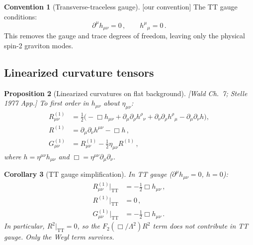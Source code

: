 \documentclass[12pt,a4paper]{article}
\newtheorem{proposition}{Proposition}[section]
\newtheorem{corollary}[proposition]{Corollary}
\theoremstyle{definition}
\newtheorem{convention}[proposition]{Convention}
\theoremstyle{remark}
\newcommand{\fromlit}[1]{\textcolor{blue!70!black}{\textsf{[#1]}}}
\newcommand{\oursign}{\textcolor{teal!80!black}{\textsf{[our convention]}}}
\begin{document}
\begin{convention}[Transverse-traceless gauge]
\label{conv:tt-gauge}
\oursign\;
The TT gauge conditions:
\begin{equation}
  \partial^\mu h_{\mu\nu} = 0\,,
  \qquad h^\mu{}_\mu = 0\,.
  \label{eq:tt-conditions}
\end{equation}
This removes the gauge and trace degrees of freedom, leaving
only the physical spin-2 graviton modes.
\end{convention}


\subsection{Linearized curvature tensors}

\begin{proposition}[Linearized curvatures on flat background]
\label{prop:linearized-curvatures}
\fromlit{Wald Ch.~7; Stelle 1977 App.}
To first order in $h_{\mu\nu}$ about $\eta_{\mu\nu}$:
\begin{align}
  R_{\mu\nu}^{(1)} &= \frac{1}{2}\bigl(
    -\Box h_{\mu\nu} + \partial_\mu\partial_\rho h^\rho{}_\nu
    + \partial_\nu\partial_\rho h^\rho{}_\mu
    - \partial_\mu\partial_\nu h
  \bigr),
  \label{eq:ricci-lin}\\[4pt]
  R^{(1)} &= \partial_\mu\partial_\nu h^{\mu\nu} - \Box h\,,
  \label{eq:scalar-lin}\\[4pt]
  G_{\mu\nu}^{(1)} &= R_{\mu\nu}^{(1)}
    - \frac{1}{2}\eta_{\mu\nu}R^{(1)}\,,
  \label{eq:einstein-lin}
\end{align}
where $h = \eta^{\mu\nu}h_{\mu\nu}$ and $\Box =
\eta^{\mu\nu}\partial_\mu\partial_\nu$.
\end{proposition}

\begin{corollary}[TT gauge simplification]
\label{cor:tt-simplification}
In TT gauge ($\partial^\mu h_{\mu\nu} = 0$, $h = 0$):
\begin{align}
  R_{\mu\nu}^{(1)}\big|_{\text{TT}} &= -\frac{1}{2}\Box h_{\mu\nu}\,,
  \label{eq:ricci-tt}\\
  R^{(1)}\big|_{\text{TT}} &= 0\,,
  \label{eq:scalar-tt}\\
  G_{\mu\nu}^{(1)}\big|_{\text{TT}} &= -\frac{1}{2}\Box h_{\mu\nu}\,.
  \label{eq:einstein-tt}
\end{align}
In particular, $R^2|_{\text{TT}} = 0$, so the $F_2(\Box/\Lambda^2)R^2$
term does not contribute in TT gauge.  Only the Weyl term survives.
\end{corollary}
\end{document}
